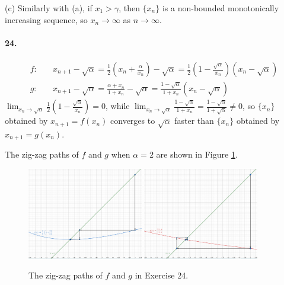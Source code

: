 \documentclass[a4paper]{article}
\begin{document}
(c)
Similarly with (a), if $x_1>\gamma$, then $\{x_n\}$ is a non-bounded monotonically increasing sequence, so $x_n\to\infty$ as $n\to\infty$.

\paragraph{24.}
\begin{equation*}
\begin{split}
    f:\quad & x_{n+1}-\sqrt{\alpha}=\frac{1}{2}\left(x_n+\frac{\alpha}{x_n} \right)-\sqrt{\alpha}=\frac{1}{2}\left(1-\frac{\sqrt{\alpha}}{x_n} \right)\left(x_n-\sqrt{\alpha} \right)\\
    g:\quad & x_{n+1}-\sqrt{\alpha}=\frac{\alpha+x_n}{1+x_n}-\sqrt{\alpha}=\frac{1-\sqrt{\alpha}}{1+x_n}(x_n-\sqrt{\alpha})
\end{split}
\end{equation*}
$\lim_{x_n\to\sqrt{\alpha}}\frac{1}{2}\left(1-\frac{\sqrt{\alpha}}{x_n} \right)=0$, while $\lim_{x_n\to\sqrt{\alpha}}\frac{1-\sqrt{\alpha}}{1+x_n}=\frac{1-\sqrt{\alpha}}{1+\sqrt{\alpha}}\neq0$, so $\{x_n\}$ obtained by $x_{n+1}=f(x_n)$ converges to $\sqrt{\alpha}$ faster than $\{x_n\}$ obtained by $x_{n+1}=g(x_n)$.

The zig-zag paths of $f$ and $g$ when $\alpha=2$ are shown in Figure \ref{fig:f}.
\begin{figure}[ht]
    \centering
    \includegraphics[width=0.45\textwidth]{f.PNG}\qquad
    \includegraphics[width=0.45\textwidth]{g.PNG}
    \caption{The zig-zag paths of $f$ and $g$ in Exercise 24.}
    \label{fig:f}
\end{figure}
\end{document}
